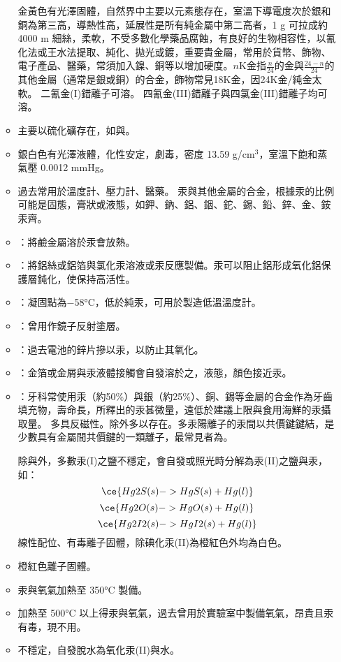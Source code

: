 \documentclass[a4paper,12pt]{report}
\begin{document}
\begin{itemize}
\begin{itemize}
金黃色有光澤固體，自然界中主要以元素態存在，室溫下導電度次於銀和銅為第三高，導熱性高，延展性是所有純金屬中第二高者，1 g 可拉成約 4000 m 細絲，柔軟，不受多數化學藥品腐蝕，有良好的生物相容性，以氰化法或王水法提取、純化、拋光或鍍，重要貴金屬，常用於貨幣、飾物、電子產品、醫藥，常須加入鎳、銅等以增加硬度。$n$K金指$\frac{n}{24}$的金與$\frac{24-n}{24}$的其他金屬（通常是銀或銅）的合金，飾物常見18K金，因24K金/純金太軟。
二氰金(I)錯離子可溶。
四氰金(III)錯離子與四氯金(III)錯離子均可溶。
\bit
\item 主要以硫化礦存在，如與。
\item 銀白色有光澤液體，化性安定，劇毒，密度 13.59 g/cm$^3$，室溫下飽和蒸氣壓 0.0012 mmHg。
\item 過去常用於溫度計、壓力計、醫藥。
\eit
{}
汞與其他金屬的合金，根據汞的比例可能是固態，膏狀或液態，如鉀、鈉、鋁、銦、鉈、錫、鉛、鋅、金、銨汞齊。
\bit
\item {}：將鹼金屬溶於汞會放熱。
\item {}：將鋁絲或鋁箔與氯化汞溶液或汞反應製備。汞可以阻止鋁形成氧化鋁保護層鈍化，使保持高活性。
\item {}：凝固點為−58°C，低於純汞，可用於製造低溫溫度計。
\item {}：曾用作鏡子反射塗層。
\item {}：過去電池的鋅片摻以汞，以防止其氧化。
\item {}：金箔或金屑與汞液體接觸會自發溶於之，液態，顏色接近汞。
\item {}：牙科常使用汞（約50\%）與銀（約25\%）、銅、錫等金屬的合金作為牙齒填充物，壽命長，所釋出的汞甚微量，遠低於建議上限與食用海鮮的汞攝取量。
\eit
{}
多具反磁性。除外多以存在。多汞陽離子的汞間以共價鍵鍵結，是少數具有金屬間共價鍵的一類離子，最常見者為。

除與外，多數汞(I)之鹽不穩定，會自發或照光時分解為汞(II)之鹽與汞，如：
\[\ce{Hg2S(s) -> HgS(s) + Hg(l)}\]
\[\ce{Hg2O(s) -> HgO(s) + Hg(l)}\]
\[\ce{Hg2I2(s) -> HgI2(s) + Hg(l)}\]
線性配位、有毒離子固體，除碘化汞(II)為橙紅色外均為白色。
\bit
\item 橙紅色離子固體。
\item 汞與氧氣加熱至 350°C 製備。
\item 加熱至 500°C 以上得汞與氧氣，過去曾用於實驗室中製備氧氣，昂貴且汞有毒，現不用。
\item {}不穩定，自發脫水為氧化汞(II)與水。
\eit



\end{itemize}
\end{itemize}
\end{document}
